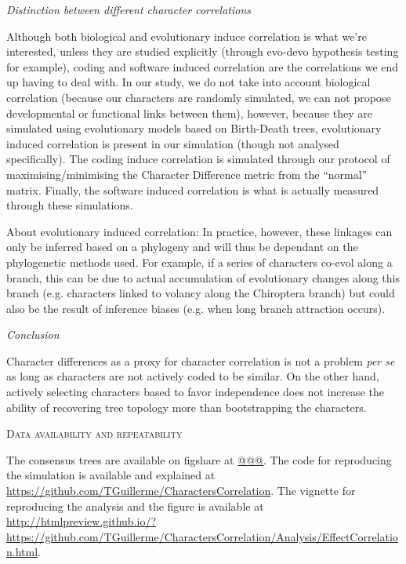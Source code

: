 \documentclass[12pt,letterpaper]{article}
\renewcommand{\section}[1]{%
\bigskip
\begin{center}
\begin{Large}
\normalfont\scshape #1
\medskip
\end{Large}
\end{center}}
\renewcommand{\subsection}[1]{%
\bigskip
\begin{center}
\begin{large}
\normalfont\itshape #1
\end{large}
\end{center}}
\begin{document}
\subsection{Distinction between different character correlations}
Although both biological and evolutionary induce correlation is what we're interested, unless they are studied explicitly (through evo-devo hypothesis testing for example), coding and software induced correlation are the correlations we end up having to deal with.
In our study, we do not take into account biological correlation (because our characters are randomly simulated, we can not propose developmental or functional links between them), however, because they are simulated using evolutionary models based on Birth-Death trees, evolutionary induced correlation is present in our simulation (though not analysed specifically).
The coding induce correlation is simulated through our protocol of maximising/minimising the Character Difference metric from the ``normal'' matrix.
Finally, the software induced correlation is what is actually measured through these simulations.


About evolutionary induced correlation:
In practice, however, these linkages can only be inferred based on a phylogeny and will thus be dependant on the phylogenetic methods used.
For example, if a series of characters co-evol along a branch, this can be due to actual accumulation of evolutionary changes along this branch (e.g. characters linked to volancy along the Chiroptera branch) but could also be the result of inference biases (e.g. when long branch attraction occurs).


\subsection{Conclusion}
Character differences as a proxy for character correlation is not a problem \textit{per se} as long as characters are not actively coded to be similar.
On the other hand, actively selecting characters based to favor independence does not increase the ability of recovering tree topology more than bootstrapping the characters.

\section{Data availability and repeatability}
The consensus trees are available on figshare at \url{@@@}.
The code for reproducing the simulation is available and explained at \url{https://github.com/TGuillerme/CharactersCorrelation}.
The vignette for reproducing the analysis and the figure is available at \url{http://htmlpreview.github.io/?https://github.com/TGuillerme/CharactersCorrelation/Analysis/EffectCorrelation.html}.
\end{document}
